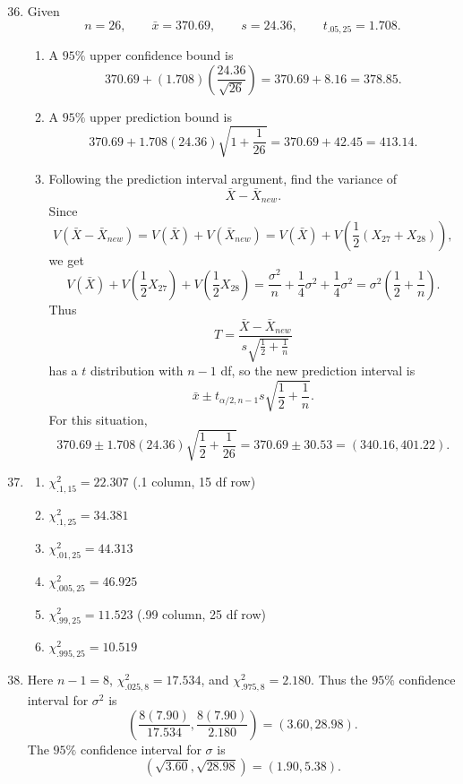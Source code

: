 \documentclass[12pt]{article}
\begin{document}
\begin{enumerate}[label=\textbf{\arabic*.}, leftmargin=*]
\setcounter{enumi}{35}
\item
Given
\[
n=26,\qquad \bar{x}=370.69,\qquad s=24.36,\qquad t_{.05,25}=1.708.
\]
\begin{enumerate}[label=\alph*.]
    \item A $95\%$ upper confidence bound is
    \[
    370.69+(1.708)\left(\frac{24.36}{\sqrt{26}}\right)=370.69+8.16=378.85.
    \]

    \item A $95\%$ upper prediction bound is
    \[
    370.69+1.708(24.36)\sqrt{1+\frac{1}{26}}
    =370.69+42.45=413.14.
    \]

    \item Following the prediction interval argument, find the variance of
    \[
    \bar{X}-\bar{X}_{new}.
    \]
    Since
    \[
    V(\bar{X}-\bar{X}_{new})=V(\bar{X})+V(\bar{X}_{new})
    =V(\bar{X})+V\left(\frac{1}{2}(X_{27}+X_{28})\right),
    \]
    we get
    \[
    V(\bar{X})+V\left(\frac{1}{2}X_{27}\right)+V\left(\frac{1}{2}X_{28}\right)
    =\frac{\sigma^2}{n}+\frac{1}{4}\sigma^2+\frac{1}{4}\sigma^2
    =\sigma^2\left(\frac{1}{2}+\frac{1}{n}\right).
    \]
    Thus
    \[
    T=\frac{\bar{X}-\bar{X}_{new}}{s\sqrt{\frac{1}{2}+\frac{1}{n}}}
    \]
    has a $t$ distribution with $n-1$ df, so the new prediction interval is
    \[
    \bar{x}\pm t_{\alpha/2,n-1}s\sqrt{\frac{1}{2}+\frac{1}{n}}.
    \]
    For this situation,
    \[
    370.69\pm1.708(24.36)\sqrt{\frac{1}{2}+\frac{1}{26}}
    =370.69\pm30.53=(340.16,401.22).
    \]
\end{enumerate}

\setcounter{enumi}{41}
\item
\begin{enumerate}[label=\alph*.]
    \item $\chi^2_{.1,15}=22.307$ \quad (.1 column, 15 df row)
    \item $\chi^2_{.1,25}=34.381$
    \item $\chi^2_{.01,25}=44.313$
    \item $\chi^2_{.005,25}=46.925$
    \item $\chi^2_{.99,25}=11.523$ \quad (.99 column, 25 df row)
    \item $\chi^2_{.995,25}=10.519$
\end{enumerate}

\setcounter{enumi}{43}
\item
Here $n-1=8$, $\chi^2_{.025,8}=17.534$, and $\chi^2_{.975,8}=2.180$. Thus the $95\%$ confidence interval for $\sigma^2$ is
\[
\left(\frac{8(7.90)}{17.534},\frac{8(7.90)}{2.180}\right)=(3.60,28.98).
\]
The $95\%$ confidence interval for $\sigma$ is
\[
(\sqrt{3.60},\sqrt{28.98})=(1.90,5.38).
\]


\end{enumerate}
\end{document}
